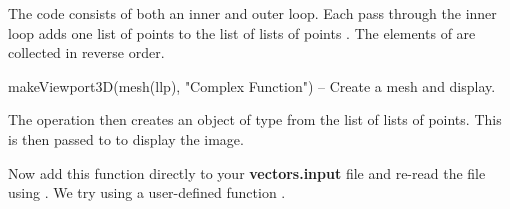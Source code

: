 The code consists of both an inner and outer loop.
Each pass through the inner loop adds one list  of points
to the list of lists of points .
The elements of  are collected in reverse order.

\begin{xmpLinesNoReset}
  makeViewport3D(mesh(llp), "Complex Function")      -- Create a mesh and display.
\end{xmpLinesNoReset}

The operation  then creates an object of type
 from the list of lists of points.
This is then passed to  to display the
image.

Now add this function directly to your {\bf vectors.input}
file and re-read the file using .
We try  using
a user-defined function .

